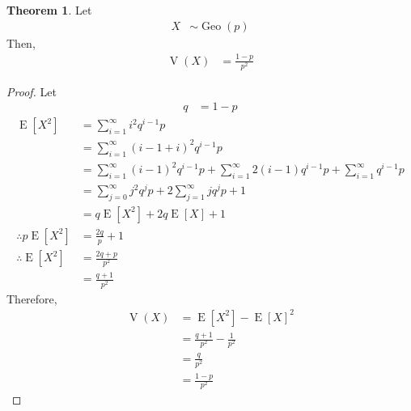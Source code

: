 \documentclass[titlepage, fleqn, a4paper, 12pt, twoside]{article}
\theoremstyle{definition}
\theoremstyle{theorem}
\newtheorem{theorem}{Theorem}
\DeclareMathOperator{\expct}{\mathrm{E}}
\DeclareMathOperator{\var}{\mathrm{V}}
\DeclareMathOperator{\geo}{\mathrm{Geo}}
\begin{document}
\begin{theorem}
	Let
	\begin{align*}
		X & \sim \geo(p)
	\end{align*}
	Then,
	\begin{align*}
		\var(X) & = \frac{1 - p}{p^2}
	\end{align*}
\end{theorem}

\begin{proof}
	Let
	\begin{align*}
		q & = 1 - p
	\end{align*}
	\begin{align*}
		\expct\left[ X^2 \right]              & = \sum\limits_{i = 1}^{\infty} i^2 q^{i - 1} p                                                                                                       \\
                                                      & = \sum\limits_{i = 1}^{\infty} (i - 1 + i)^2 q^{i - 1} p                                                                                             \\
                                                      & = \sum\limits_{i = 1}^{\infty} (i - 1)^2 q^{i - 1} p + \sum\limits_{i = 1}^{\infty} 2 (i - 1) q^{i - 1} p + \sum\limits_{i = 1}^{\infty} q^{i - 1} p \\
                                                      & = \sum\limits_{j = 0}^{\infty} j^2 q^j p + 2 \sum\limits_{j = 1}^{\infty} j q^j p + 1                                                                \\
                                                      & = q \expct\left[ X^2 \right] + 2 q \expct[X] + 1                                                                                                     \\
		\therefore p \expct\left[ X^2 \right] & = \frac{2 q}{p} + 1                                                                                                                                  \\
		\therefore \expct\left[ X^2 \right]   & = \frac{2 q + p}{p^2}                                                                                                                                \\
                                                      & = \frac{q + 1}{p^2}
	\end{align*}
	Therefore,
	\begin{align*}
		\var(X) & = \expct\left[ X^2 \right] - \expct[X]^2 \\
                        & = \frac{q + 1}{p^2} - \frac{1}{p^2}      \\
                        & = \frac{q}{p^2}                          \\
                        & = \frac{1 - p}{p^2}
	\end{align*}
\end{proof}
\end{document}

